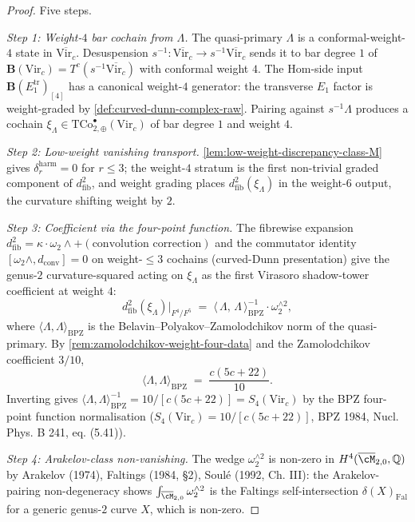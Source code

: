 \begin{proof}
Five steps.

\emph{Step 1: Weight-\(4\) bar cochain from \(\Lambda\).} The
quasi-primary \(\Lambda\) is a conformal-weight-\(4\) state in
\(\overline{\mathrm{Vir}_{c}}\). Desuspension
\(s^{-1}: \overline{\mathrm{Vir}_{c}} \to s^{-1}\overline{\mathrm{Vir}_{c}}\)
sends it to bar degree \(1\) of
\(\mathbf{B}(\mathrm{Vir}_{c}) = T^{c}(s^{-1}\overline{\mathrm{Vir}_{c}})\)
with conformal weight \(4\). The Hom-side input
\(\mathbf{B}(E_{1}^{\mathrm{tr}})_{[4]}\) has a canonical
weight-\(4\) generator: the transverse \(E_{1}\) factor is
weight-graded by \autoref{def:curved-dunn-complex-raw}. Pairing
against \(s^{-1}\Lambda\) produces a cochain
\(\xi_{\Lambda} \in
\mathrm{TCo}^{\bullet}_{2,\oplus}(\mathrm{Vir}_{c})\) of bar
degree \(1\) and weight \(4\).

\emph{Step 2: Low-weight vanishing transport.}
\autoref{lem:low-weight-discrepancy-class-M} gives
\(\delta_{r}^{\mathrm{harm}} = 0\) for \(r \le 3\); the
weight-\(4\) stratum is the first non-trivial graded component
of \(d^{2}_{\mathrm{fib}}\), and weight grading places
\(d^{2}_{\mathrm{fib}}(\xi_{\Lambda})\) in the weight-\(6\)
output, the curvature shifting weight by \(2\).

\emph{Step 3: Coefficient via the four-point function.} The
fibrewise expansion
\(d^{2}_{\mathrm{fib}} = \kappa \cdot \omega_{2} \wedge +
(\text{convolution correction})\) and the commutator identity
\([\omega_{2}\wedge, d_{\mathrm{conv}}] = 0\) on weight-\(\le 3\)
cochains (curved-Dunn presentation) give the
genus-\(2\) curvature-squared acting on \(\xi_{\Lambda}\) as the
first Virasoro shadow-tower coefficient at weight \(4\):
\[
 d^{2}_{\mathrm{fib}}(\xi_{\Lambda})\Big|_{F^{4}/F^{5}}
 \;=\;
 \bigl\langle\, \Lambda,\, \Lambda \,\bigr\rangle_{\mathrm{BPZ}}^{-1}
 \cdot
 \omega_{2}^{\wedge 2},
\]
where \(\langle \Lambda, \Lambda \rangle_{\mathrm{BPZ}}\) is the
Belavin--Polyakov--Zamolodchikov norm of the quasi-primary. By
\autoref{rem:zamolodchikov-weight-four-data} and the
Zamolodchikov coefficient \(3/10\),
\[
 \langle \Lambda, \Lambda \rangle_{\mathrm{BPZ}}
 \;=\;
 \frac{c(5c + 22)}{10}.
\]
Inverting gives
\(\langle \Lambda, \Lambda \rangle_{\mathrm{BPZ}}^{-1} = 10 / [c(5c+22)] = S_{4}(\mathrm{Vir}_{c})\)
by the BPZ four-point function normalisation
(\(S_{4}(\mathrm{Vir}_{c}) = 10 / [c(5c + 22)]\), BPZ 1984,
Nucl. Phys. B 241, eq. (5.41)).

\emph{Step 4: Arakelov-class non-vanishing.} The wedge
\(\omega_{2}^{\wedge 2}\) is non-zero in
\(H^{4}(\overline{\cM}_{2,0}, \mathbb{Q})\) by
Arakelov (1974), Faltings (1984, \S 2), Soul\'e (1992, Ch. III):
the Arakelov-pairing non-degeneracy shows
\(\int_{\overline{\cM}_{2,0}} \omega_{2}^{\wedge 2}\) is the
Faltings self-intersection \(\delta(X)_{\mathrm{Fal}}\) for a
generic genus-\(2\) curve \(X\), which is non-zero.


\end{proof}
